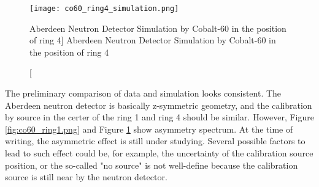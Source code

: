 \begin{figure}
    \centering
    \texttt{[image: co60\_ring4\_simulation.png]}
    \caption
    [Aberdeen Neutron Detector Simulation by Cobalt-60 in the position of ring 4]
    {Aberdeen Neutron Detector Simulation by Cobalt-60 in the position of ring 4}
    \label{fig:co60_ring4_simulation}
    \end{figure}


The preliminary comparison of data and simulation looks consistent.
The Aberdeen neutron detector is basically z-symmetric geometry, and the calibration by
source in the certer of the ring 1 and ring 4 should be similar.
However, Figure \ref{fig:co60_ring1.png} and Figure \ref{fig:co60_ring4_simulation} show asymmetry spectrum.
At the time of writing, the asymmetric effect is still under studying.
Several possible factors to lead to such effect could be, for example, the uncertainty of the calibration source position,
or the so-called "no source" is not well-define because the calibration source is still near by the neutron detector.


%

